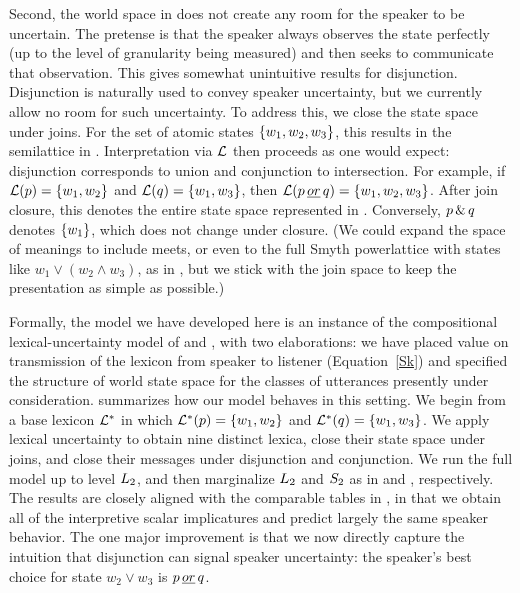 \documentclass[12pt,twoside]{article}
\renewcommand{\_}{\textbf{\textunderscore\hspace{-4pt}\textunderscore\hspace{-3pt}\textunderscore\hspace{-4pt}\textunderscore}\hspace{0.5pt}}			%
\begin{document}
Second, the world space in  does not create any
room for the speaker to be uncertain. The pretense is that the speaker
always observes the state perfectly (up to the level of granularity
being measured) and then seeks to communicate that observation. This
gives somewhat unintuitive results for disjunction. Disjunction is
naturally used to convey speaker uncertainty, but we currently allow
no room for such uncertainty.  To address this, we close the state
space under joins.  For the set of atomic states
$\set{w_{1}, w_{2}, w_{3}}$, this results in the semilattice in
. Interpretation via $\Lex$ then proceeds as one
would expect: disjunction corresponds to union and conjunction to
intersection. For example, if $\Lex(p) = \set{w_{1}, w_{2}}$ and
$\Lex(q) = \set{w_{1}, w_{3}}$, then
$\Lex(\porq) = \set{w_{1}, w_{2}, w_{3}}$.  After join closure, this
denotes the entire state space represented in
. Conversely, $\pandq$ denotes $\set{w_{1}}$,
which does not change under closure. (We could expand the space of
meanings to include meets, or even to the full Smyth powerlattice with
states like $w_{1}{\vee} (w_{2}{\wedge} w_{3})$, as in
\citealt{levy-pollard:2001}, but we stick with the join space to keep
the presentation as simple as possible.)

Formally, the model we have developed here is an instance of the
compositional lexical-uncertainty model of
\citet{bergen-levy-goodman:2014} and
\citet{levy-bergen-goodman:2014SALT}, with two elaborations: we have
placed value on transmission of the lexicon from speaker to listener
(Equation~\ref{Sk}) and specified the structure of world state space
for the classes of utterances presently under consideration.
 summarizes how our model behaves in this
setting. We begin from a base lexicon $\LexStar$ in which $\LexStar(p)
= \set{w_{1}, w_{2}}$ and $\LexStar(q) = \set{w_{1}, w_{3}}$. We apply
lexical uncertainty to obtain nine distinct lexica, close their state
space under joins, and close their messages under disjunction and
conjunction. We run the full model up to level $\ListenerK[2]$, and
then marginalize $\ListenerK[2]$ and $\SpeakerK[2]$ as in 
and , respectively. The results are closely aligned with
the comparable tables in , in that we obtain all
of the interpretive scalar implicatures and predict largely the same
speaker behavior. The one major improvement is that we now directly
capture the intuition that disjunction can signal speaker uncertainty:
the speaker's best choice for state $w_{2}{\vee}w_{3}$ is $\porq$.
\end{document}
